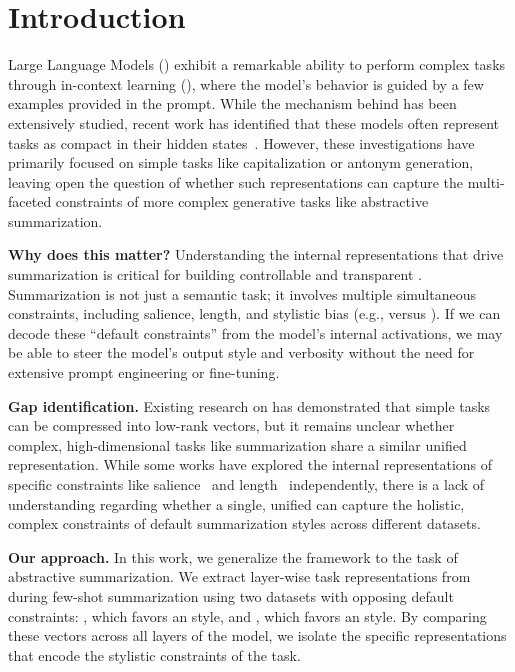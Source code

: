 \section{Introduction}
\label{sec:introduction}

Large Language Models (\fvsabbr) exhibit a remarkable ability to perform complex tasks through in-context learning (\icl), where the model's behavior is guided by a few examples provided in the prompt. While the mechanism behind \icl has been extensively studied, recent work has identified that these models often represent tasks as compact \newterm{\fvs} in their hidden states~\cite{todd2023function}. However, these investigations have primarily focused on simple tasks like capitalization or antonym generation, leaving open the question of whether such representations can capture the multi-faceted constraints of more complex generative tasks like abstractive summarization.

{\bf Why does this matter?} Understanding the internal representations that drive summarization is critical for building controllable and transparent \fvsabbr. Summarization is not just a semantic task; it involves multiple simultaneous constraints, including salience, length, and stylistic bias (e.g., \extractive versus \abstractive). If we can decode these ``default constraints'' from the model's internal activations, we may be able to steer the model's output style and verbosity without the need for extensive prompt engineering or fine-tuning.

{\bf Gap identification.} Existing research on \fvs has demonstrated that simple tasks can be compressed into low-rank vectors, but it remains unclear whether complex, high-dimensional tasks like summarization share a similar unified representation. While some works have explored the internal representations of specific constraints like salience~\cite{zhou2026what} and length~\cite{moon2025length} independently, there is a lack of understanding regarding whether a single, unified \fv can capture the holistic, complex constraints of default summarization styles across different datasets.

{\bf Our approach.} In this work, we generalize the \fv framework to the task of abstractive summarization. We extract layer-wise task representations from \gpttwo during few-shot summarization using two datasets with opposing default constraints: \cnndm, which favors an \extractive style, and \xsum, which favors an \abstractive style. By comparing these vectors across all layers of the model, we isolate the specific representations that encode the stylistic constraints of the task.

